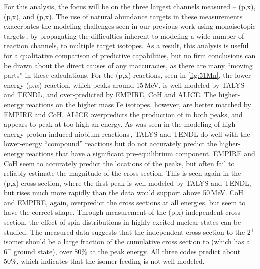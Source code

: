 For this analysis, the focus will be on the three largest channels  measured -- (p,x), (p,x), and (p,x).
The use of natural abundance targets in these measurements exacerbates the modeling  challenges seen in our previous work using monoisotopic targets\,\cite{Voyles2018a}, by propagating the difficulties inherent to modeling a wide number of reaction channels, to multiple target isotopes.
As a result, this analysis is useful for a qualitative comparison of predictive capabilities, but no firm conclusions can be drawn about the direct causes of any inaccuracies, as there are many \enquote{moving parts} in these calculations.
For the (p,x) reactions, seen in \autoref{fig:51Mn}, the lower-energy  (p,$\alpha$) reaction, which peaks around 15\,MeV, is  well-modeled by TALYS and TENDL, and over-predicted by EMPIRE, CoH and ALICE.
The higher-energy reactions on the higher mass Fe isotopes, however, are better matched by  EMPIRE and CoH.
ALICE overpredicts the production of  in both peaks, and appears to peak at too high an energy.
As was seen in the modeling of high-energy proton-induced niobium reactions\,\cite{Voyles2018a}, TALYS and TENDL do well with the lower-energy \enquote{compound} reactions but do not accurately predict the higher-energy reactions that have a significant pre-equilibrium component.
EMPIRE and CoH seem to accurately predict the locations of the peaks, but often fail to reliably estimate the magnitude of the cross section.
This is seen again in the  (p,x) cross section, where the first peak is well-modeled by TALYS and TENDL, but  rises much more rapidly than the data would support above 50\,MeV.
CoH and EMPIRE, again, overpredict the cross sections at all energies, but seem to have the correct shape.
Through measurement of the  (p,x) independent cross section, the effect of spin distributions in highly-excited nuclear states can be studied.
The measured data suggests that the independent cross section to the $2^+$ isomer should be a large fraction of the cumulative cross section to  (which has a $6^+$ ground state), over 80\% at the peak energy.
All three codes predict about 50\%, which indicates that the isomer feeding is not well-modeled.
